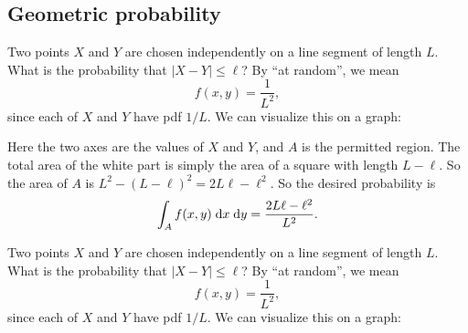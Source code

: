\subsection{Geometric probability}

\begin{note}
  \begin{field}
    \begin{eg}
      Two points $X$ and $Y$ are chosen independently on a line segment of length $L$. What is the probability that $|X - Y| \leq \ell$? By ``at random'', we mean
      \[
        f(x, y) = \frac{1}{L^2},
      \]
      since each of $X$ and $Y$ have pdf $1/L$.
      We can visualize this on a graph:
      \begin{center}
      \end{center}
      Here the two axes are the values of $X$ and $Y$, and $A$ is the permitted region. The total area of the white part is simply the area of a square with length $L - \ell$. So the area of $A$ is $L^2 - (L - \ell)^2 = 2L\ell - \ell^2$. So the desired probability is
      \[
        \int_A f(x, y)\;\mathrm{d} x\;\mathrm{d} y = \frac{2L\ell - \ell^2}{L^2}.
      \]
    \end{eg}
  \end{field}
  \begin{field}
    \begin{eg}
      Two points $X$ and $Y$ are chosen independently on a line segment of length $L$. What is the probability that $|X - Y| \leq \ell$? By ``at random'', we mean
      \[
        f(x, y) = \frac{1}{L^2},
      \]
      since each of $X$ and $Y$ have pdf $1/L$.
      We can visualize this on a graph:
      \begin{center}
\end{center}
\end{eg}
\end{field}
\end{note}
